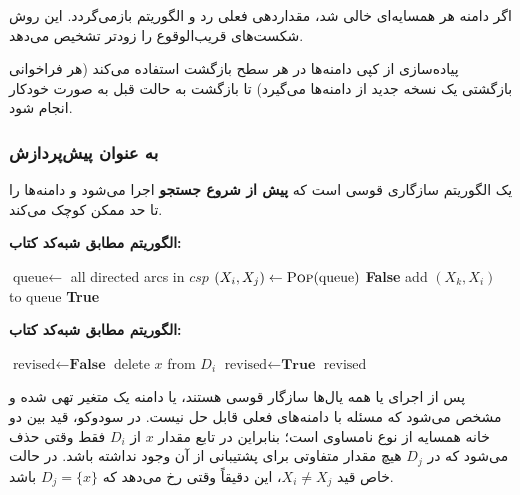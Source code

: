 \documentclass[10.5pt]{exam}
\begin{document}
اگر دامنه هر همسایه‌ای خالی شد، مقداردهی فعلی رد و الگوریتم بازمی‌گردد.
این روش شکست‌های قریب‌الوقوع را زودتر تشخیص می‌دهد.

پیاده‌سازی از کپی دامنه‌ها در هر سطح بازگشت استفاده می‌کند
(هر فراخوانی بازگشتی یک نسخه جدید از دامنه‌ها می‌گیرد)
تا بازگشت به حالت قبل به صورت خودکار انجام شود.

\subsubsection*{ به عنوان پیش‌پردازش}

یک الگوریتم سازگاری قوسی است که \textbf{پیش از شروع جستجو} اجرا می‌شود
و دامنه‌ها را تا حد ممکن کوچک می‌کند.

\textbf{الگوریتم  مطابق شبه‌کد کتاب:}

\begin{latin}
\begin{algorithm}[H]
\caption{AC-3$(csp)$}
\begin{algorithmic}[1]
  \State $\text{queue} \leftarrow$ all directed arcs in $csp$
    \State $(X_i, X_j) \leftarrow \textsc{Pop}(\text{queue})$
        \State \Return \textbf{False}
      \EndIf
        \State add $(X_k, X_i)$ to $\text{queue}$
      \EndFor
    \EndIf
  \EndWhile
  \State \Return \textbf{True}
\end{algorithmic}
\end{algorithm}
\end{latin}

\textbf{الگوریتم  مطابق شبه‌کد کتاب:}

\begin{latin}
\begin{algorithm}[H]
\caption{REVISE$(csp, X_i, X_j)$}
\begin{algorithmic}[1]
  \State $\text{revised} \leftarrow \textbf{False}$
      \State delete $x$ from $D_i$
      \State $\text{revised} \leftarrow \textbf{True}$
    \EndIf
  \EndFor
  \State \Return $\text{revised}$
\end{algorithmic}
\end{algorithm}
\end{latin}

پس از اجرای
یا همه یال‌ها سازگار قوسی هستند، یا دامنه یک متغیر تهی شده و مشخص می‌شود که مسئله با دامنه‌های فعلی قابل حل نیست.
در سودوکو، قید بین دو خانه همسایه از نوع نامساوی است؛ بنابراین در تابع
مقدار
$x$
از
$D_i$
فقط وقتی حذف می‌شود که در
$D_j$
هیچ مقدار متفاوتی برای پشتیبانی از آن وجود نداشته باشد. در حالت خاص قید
$X_i \neq X_j$،
این دقیقاً وقتی رخ می‌دهد که
$D_j=\{x\}$
باشد.
\end{document}
